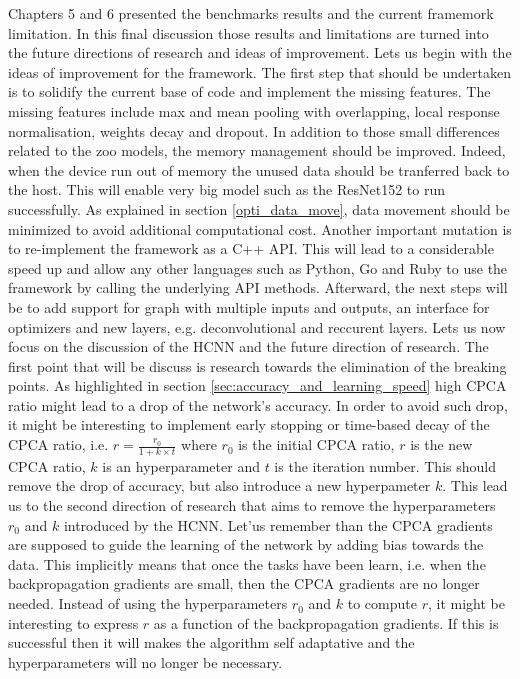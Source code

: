 \documentclass[11pt]{report}
\begin{document}
Chapters 5 and 6 presented the benchmarks results and the current framemork limitation. In this final discussion those results and limitations are turned into the future directions of research and ideas of improvement.
\newline
\newline
Lets us begin with the ideas of improvement for the framework. The first step that should be undertaken is to solidify the current base of code and implement the missing features. The missing features include max and mean pooling with overlapping, local response normalisation, weights decay and dropout. In addition to those small differences related to the zoo models, the memory management should be improved. Indeed, when the device run out of memory the unused data should be tranferred back to the host. This will enable very big model such as the ResNet152 to run successfully. As explained in section \ref{opti_data_move}, data movement should be minimized to avoid additional computational cost. Another important mutation is to re-implement the framework as a C++ API. This will lead to a considerable speed up and allow any other languages such as Python, Go and Ruby to use the framework by calling the underlying API methods. Afterward, the next steps will be to add support for graph with multiple inputs and outputs, an interface for optimizers and new layers, e.g. deconvolutional and reccurent layers. 
\newline
\newline
Lets us now focus on the discussion of the HCNN and the future direction of research. The first point that will be discuss is research towards the elimination of the breaking points. As highlighted in section \ref{sec:accuracy_and_learning_speed} high CPCA ratio might lead to a drop of the network's accuracy. In order to avoid such drop, it might be interesting to implement early stopping or time-based decay of the CPCA ratio, i.e. $r = \frac{r_0}{1 + k \times t}$ where $r_0$ is the initial CPCA ratio, $r$ is the new CPCA ratio, $k$ is an hyperparameter and $t$ is the iteration number. This should remove the drop of accuracy, but also introduce a new hyperpameter $k$.
\newline
\newline
This lead us to the second direction of research that aims to remove the hyperparameters $r_0$ and $k$ introduced by the HCNN. Let'us remember than the CPCA gradients are supposed to guide the learning of the network by adding bias towards the data. This implicitly means that once the tasks have been learn, i.e. when the backpropagation gradients are small, then the CPCA gradients are no longer needed. Instead of using the hyperparameters $r_0$ and $k$ to compute $r$, it might be interesting to express $r$ as a function of the backpropagation gradients. If this is successful then it will makes the algorithm self adaptative and the hyperparameters will no longer be necessary.
\end{document}
